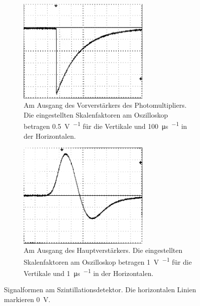 \documentclass[11pt, a4paper]{article}
\numberwithin{equation}{section}
\begin{document}
\begin{figure}[ht]
	\centering
	\begin{subfigure}[b]{0.7\textwidth}
		\centering
		\includegraphics[width=0.7\textwidth]{./figures/signale/vor_szinti_abgeschnitten.jpg}
		\caption{Am Ausgang des Vorverstärkers des Photomultipliers. Die eingestellten Skalenfaktoren am Oszilloskop betragen \SI{0.5}{\volt\per\division} für die Vertikale und \SI{100}{\micro\second\per\division} in der Horizontalen.}
		\label{fig:signal_szinti_vor}
	\end{subfigure}
	
	\begin{subfigure}[b]{0.7\textwidth}
		\centering
		\includegraphics[width=0.7\textwidth]{./figures/signale/haupt_szinti_abgeschnitten.jpg}
		\caption{Am Ausgang des Hauptverstärkers. Die eingestellten Skalenfaktoren am Oszilloskop betragen \SI{1}{\volt\per\division} für die Vertikale und \SI{1}{\micro\second\per\division} in der Horizontalen.}
		\label{fig:signal_szinti_haupt}
	\end{subfigure}
	\caption{Signalformen am Szintillationsdetektor. Die horizontalen Linien markieren \SI{0}{\volt}.}
\end{figure}
\end{document}
